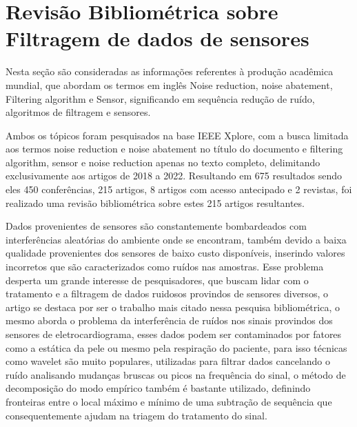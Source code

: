 \chapter{Revisão Bibliométrica sobre Filtragem de dados de sensores}\label{referencial_teorico}

Nesta seção são consideradas as informações referentes à produção acadêmica mundial, que abordam os termos em inglês Noise reduction, noise abatement, Filtering algorithm e Sensor, significando em sequência redução de ruído, algoritmos de filtragem e sensores.

Ambos os tópicos foram pesquisados na base IEEE Xplore, com a busca limitada aos termos noise reduction e noise abatement no título do documento e filtering algorithm, sensor e noise reduction apenas no texto completo, delimitando exclusivamente aos artigos de 2018 a 2022. Resultando em 675 resultados sendo eles 450 conferências, 215 artigos, 8 artigos com acesso  antecipado e 2 revistas, foi realizado uma revisão bibliométrica sobre estes 215 artigos resultantes.

Dados provenientes de sensores são constantemente bombardeados com interferências aleatórias do ambiente onde se encontram, também devido a baixa qualidade provenientes dos sensores de baixo custo disponíveis, inserindo valores incorretos que são caracterizados como ruídos nas amostras. Esse problema desperta um grande interesse de pesquisadores, que buscam lidar com o tratamento e a filtragem de dados ruidosos provindos de sensores diversos, o artigo \cite{chiang_noise_reduction_in_ECG} se destaca por ser o trabalho mais citado nessa pesquisa bibliométrica, o mesmo aborda o problema da interferência de ruídos nos sinais provindos dos sensores de eletrocardiograma, esses dados podem ser contaminados por fatores como a estática da pele ou mesmo pela respiração do paciente, para isso técnicas como wavelet são muito populares, utilizadas para filtrar dados cancelando o ruído analisando mudanças bruscas ou picos na frequência do sinal, o método de decomposição do modo empírico também é bastante utilizado, definindo fronteiras entre o local máximo e mínimo de uma subtração de sequência que consequentemente ajudam na triagem do tratamento do sinal.

